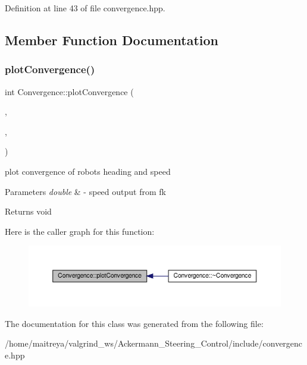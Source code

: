 Definition at line 43 of file convergence.\+hpp.



\subsection{Member Function Documentation}
\mbox{\label{classConvergence_a7683c2efed8e5526481d361cb28bb6cf}} 
\subsubsection{\texorpdfstring{plot\+Convergence()}{plotConvergence()}}
{\footnotesize\ttfamily int Convergence\+::plot\+Convergence (\begin{DoxyParamCaption}\item[{double}]{,  }\item[{std\+::vector$<$ double $>$ \&}]{,  }\item[{std\+::string \&}]{ }\end{DoxyParamCaption})}



plot convergence of robot\textquotesingle{}s heading and speed 


\begin{DoxyParams}{Parameters}
{\em double} & -\/ speed output from fk \\
\hline
\end{DoxyParams}
\begin{DoxyReturn}{Returns}
void 
\end{DoxyReturn}
Here is the caller graph for this function\+:
\nopagebreak
\begin{figure}[H]
\begin{center}
\leavevmode
\includegraphics[width=350pt]{classConvergence_a7683c2efed8e5526481d361cb28bb6cf_icgraph}
\end{center}
\end{figure}


The documentation for this class was generated from the following file\+:\begin{DoxyCompactItemize}
\item 
/home/maitreya/valgrind\+\_\+ws/\+Ackermann\+\_\+\+Steering\+\_\+\+Control/include/convergence.\+hpp\end{DoxyCompactItemize}
